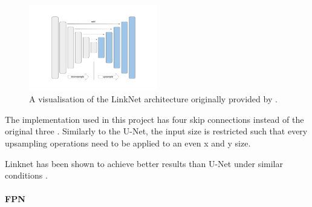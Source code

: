 \begin{figure}
	\centering
	\includegraphics[width=0.5\textwidth]{fig/linknet-architecture.png}
	\caption{A visualisation of the LinkNet architecture originally provided by \citeauthor{SegmentationModels} \cite{SegmentationModels}.}
	\label{fig:linknet-architecture}
\end{figure}



The implementation used in this project has four skip connections instead of the original three \cite{SegmentationModels}. Similarly to the U-Net, the input size is restricted such that every upsampling operations need to be applied to an even x and y size.

Linknet has been shown to achieve better results than U-Net under similar conditions \cite{Gao2022}.

\paragraph{FPN}

